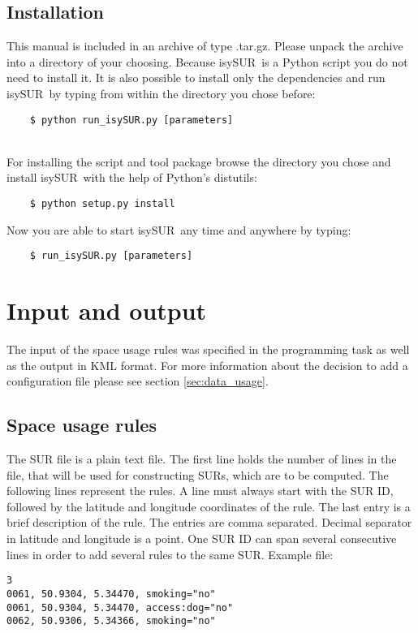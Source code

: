 \documentclass[11pt,fleqn]{book} %
\newcommand{\ProjectTitle}{isySUR}
\newcommand{\pt}{\ProjectTitle}
\begin{document}
\subsection{Installation}
This manual is included in an archive of type .tar.gz. Please unpack the archive into a directory of your choosing. Because \pt\ is a Python script you do not need to install it. It is also possible to install only the dependencies and run \pt\ by typing from within the directory you chose before:
\begin{verbatim}
	$ python run_isySUR.py [parameters]
\end{verbatim}
~\\

For installing the script and tool package browse the directory you chose and install \pt\ with the help of Python's distutils:
\begin{verbatim}
	$ python setup.py install
\end{verbatim}
Now you are able to start \pt\ any time and anywhere by typing:
\begin{verbatim}
	$ run_isySUR.py [parameters]
\end{verbatim}

\section{Input and output}\label{sec:io}
The input of the space usage rules was specified in the programming task as well as the output in KML format. For more information about the decision to add a configuration file please see section \ref{sec:data_usage}.

\subsection{Space usage rules}
The SUR file is a plain text file. The first line holds the number of lines in the file, that will be used for constructing SURs, which are to be computed. The following lines represent the rules. A line must always start with the SUR ID, followed by the latitude and longitude coordinates of the rule. The last entry is a brief description of the rule. The entries are comma separated. Decimal separator in latitude and longitude is a point. One SUR ID can span several consecutive lines in order to add several rules to the same SUR.
\newpage
Example file:
\begin{verbatim}
3
0061, 50.9304, 5.34470, smoking="no"
0061, 50.9304, 5.34470, access:dog="no"
0062, 50.9306, 5.34366, smoking="no"
\end{verbatim}
\end{document}
